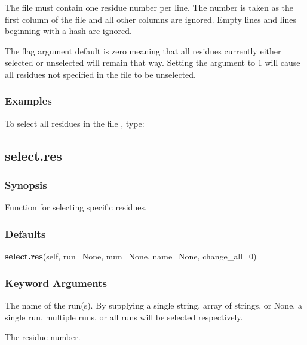 The file must contain one residue number per line.  The number is taken as the first column of the file and all other columns are ignored.  Empty lines and lines beginning with a hash are ignored.


The  flag argument default is zero meaning that all residues currently either selected or unselected will remain that way.  Setting the argument to 1 will cause all residues not specified in the file to be unselected.



\subsubsection{Examples}

To select all residues in the file , type:






\newpage

\subsection{select.res}


\subsubsection{Synopsis}

Function for selecting specific residues.



\subsubsection{Defaults}

\textsf{\textbf{select.res}(self, run=None, num=None, name=None, change\_all=0)}


\subsubsection{Keyword Arguments}

  The name of the run(s).  By supplying a single string, array of strings, or None, a single run, multiple runs, or all runs will be selected respectively. 

  The residue number. 

